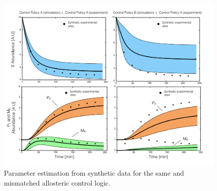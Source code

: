 \documentclass[12pt]{article}
\begin{document}
\begin{figure}
\centering
\includegraphics[width=1.0\textwidth]{./figs/Figure-5-ParameterFit.pdf}
\caption{Parameter estimation from synthetic data for the same and mismatched allosteric control logic. }\label{fig-parameter-fit}
\end{figure}

\clearpage

\renewcommand\thefigure{S\arabic{figure}}
\renewcommand\thetable{T\arabic{table}}
\renewcommand\thepage{S-\arabic{page}}
\renewcommand\theequation{S\arabic{equation}}

\setcounter{equation}{0}
\setcounter{table}{0}
\setcounter{figure}{0}
\setcounter{page}{1}
\end{document}
